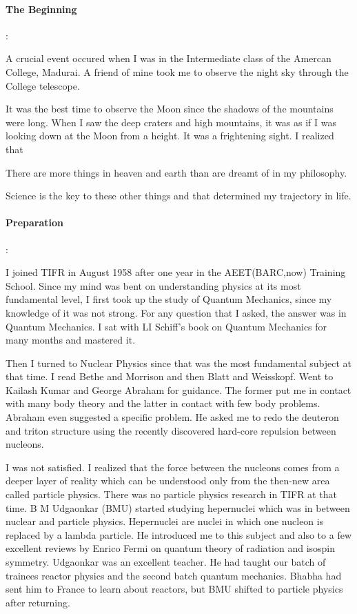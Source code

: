 \paragraph{The Beginning}:

A crucial event occured when I was in the Intermediate class of the 
Amercan College, Madurai. A friend of mine took me to observe the night 
sky through the College telescope.

It was the best time to observe the Moon since the shadows of the 
mountains were long. When I saw the deep craters and high mountains, it 
was as if I was looking down at the Moon from a height. It was a 
frightening sight. I realized that

There are more things in heaven and earth than are dreamt of in my 
philosophy.

Science is the key to these other things and that determined my 
trajectory in life.

\paragraph{Preparation}:

I joined TIFR in August 1958 after one year in the AEET(BARC,now) 
Training School.  Since my mind was bent on understanding physics at its 
most fundamental level, I first took up the study of Quantum Mechanics, 
since my knowledge of it was not strong. For any question that I asked, 
the answer was in Quantum Mechanics. I sat with LI Schiff's book on 
Quantum Mechanics for many months and mastered it.

Then I turned to Nuclear Physics since that was the most fundamental 
subject at that time. I read Bethe and Morrison and then Blatt and 
Weisskopf. Went to Kailash Kumar and George Abraham for guidance. The 
former put me in contact with many body theory and the latter in contact 
with few body problems. Abraham even suggested a specific problem. He 
asked me to redo the deuteron and triton structure using the recently 
discovered hard-core repulsion between nucleons.

I was not satisfied. I realized that the force between the nucleons 
comes from a deeper layer of reality which can be understood only from 
the then-new area called particle physics. There was no particle physics 
research in TIFR at that time. B M Udgaonkar (BMU) started studying 
hepernuclei which was in between nuclear and particle physics. 
Hepernuclei are nuclei in which one nucleon is replaced by a lambda 
particle. He introduced me to this subject and also to a few excellent 
reviews by Enrico Fermi on quantum theory of radiation and isospin 
symmetry. Udgaonkar was an excellent teacher. He had taught our batch of 
trainees reactor physics and the second batch quantum mechanics. Bhabha 
had sent him to France to learn about reactors, but BMU shifted to 
particle physics after returning.

